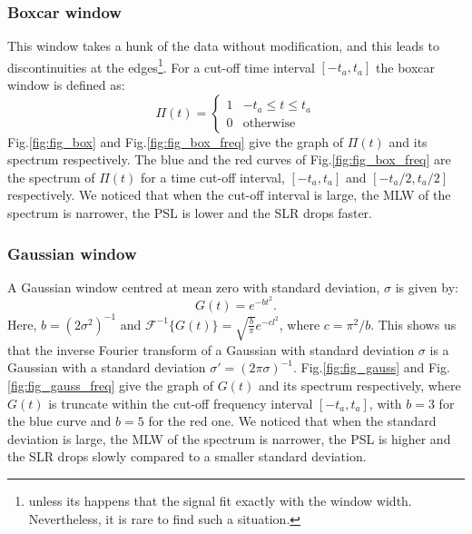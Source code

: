 \documentclass[useAMS,usenatbib]{mn2e}
\begin{document}
\subsubsection{Boxcar window}
This window takes a hunk of the data without modification, and  this leads to discontinuities at the edges\footnote{unless its 
happens that the signal  fit exactly with the window width. Nevertheless, it is rare to find such a situation.}. For 
a cut-off time interval  $[-t_a,t_a]$ the boxcar window is defined as:
\begin{equation}
\Pi(t)=\left\{
\begin{array}{rl}
1 & \mbox{$-t_a \leq t \leq t_a$} \\
0 & \mbox{otherwise}
\end{array}\right.
\end{equation}
Fig.\ref{fig:fig_box} and Fig.\ref{fig:fig_box_freq} give the graph of $\Pi(t)$ and its spectrum respectively. The blue and 
the red curves of Fig.\ref{fig:fig_box_freq} are the spectrum of $\Pi(t)$ for a time cut-off interval, $[-t_a, t_a]$ and 
$[-t_a/2,t_a/2]$ respectively. We noticed that when the cut-off interval is large, the MLW of the spectrum is 
narrower, the PSL is lower and the SLR drops faster.
\subsubsection{Gaussian window}
A Gaussian window centred at mean zero with standard deviation, $\sigma$ is given by: 
\begin{equation}
  G(t)= e^{-bt^{2}}.
\end{equation}
Here, $b=(2\sigma^2)^{-1}$ and  $\mathcal{F}^{-1}\big\{G(t)\big\}=\sqrt{\frac{b}{\pi}}e^{-cl^2}$, where $c=\pi^2/b$.
This shows us that the inverse Fourier transform of a Gaussian with standard deviation $\sigma$ is a Gaussian with a standard 
deviation $\sigma '= (2\pi\sigma)^{-1}$.
Fig.\ref{fig:fig_gauss} and Fig.\ref{fig:fig_gauss_freq} give the graph of $G(t)$ and its spectrum respectively, where $G(t)$ 
is truncate within the cut-off frequency interval $[-t_a,t_a]$, with $b = 3$ for the blue curve and $b=5$ for the red one. We noticed 
that when the standard deviation is large, the MLW of the spectrum is narrower, the PSL is higher and the SLR drops slowly compared to a 
smaller standard deviation.
\end{document}
